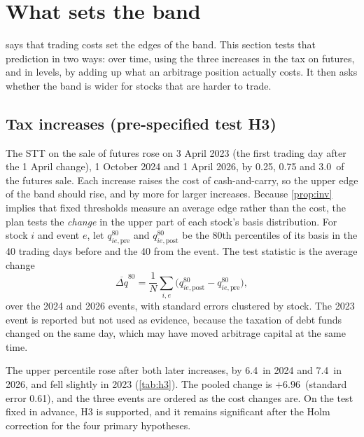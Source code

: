 \section{What sets the band}\label{sec:costs}

 says that trading costs set the edges of the band. This section tests that prediction in two ways: over
time, using the three increases in the tax on futures, and in levels, by adding up what an arbitrage position actually
costs. It then asks whether the band is wider for stocks that are harder to trade.

\subsection{Tax increases (pre-specified test H3)}
The STT on the sale of futures rose on 3 April 2023 (the first trading day after the 1 April change), 1 October 2024 and
1 April 2026, by 0.25, 0.75 and 3.0\bp\ of the futures sale. Each increase raises the cost of cash-and-carry, so the
upper edge of the band should rise, and by more for larger increases. Because \cref{prop:inv} implies that fixed
thresholds measure an average edge rather than the cost, the plan tests the \emph{change} in the upper part of each
stock's basis distribution. For stock $i$ and event $e$, let $q^{80}_{ie,\text{pre}}$ and $q^{80}_{ie,\text{post}}$ be
the 80th percentiles of its basis in the 40 trading days before and the 40 from the event. The test statistic is the
average change
\begin{equation}\label{eq:h3}
\overline{\Delta q}^{80}=\frac{1}{N}\sum_{i,e}\big(q^{80}_{ie,\text{post}}-q^{80}_{ie,\text{pre}}\big),
\end{equation}
over the 2024 and 2026 events, with standard errors clustered by stock. The 2023 event is reported but not used as
evidence, because the taxation of debt funds changed on the same day, which may have moved arbitrage capital at the
same time.

The upper percentile rose after both later increases, by 6.4\bp\ in 2024 and 7.4\bp\ in 2026, and fell slightly in
2023 (\cref{tab:h3}). The pooled change is $+6.96$\bp\ (standard error 0.61), and the three events are ordered as the
cost changes are. On the test fixed in advance, H3 is supported, and it remains significant after the Holm correction for
the four primary hypotheses.

